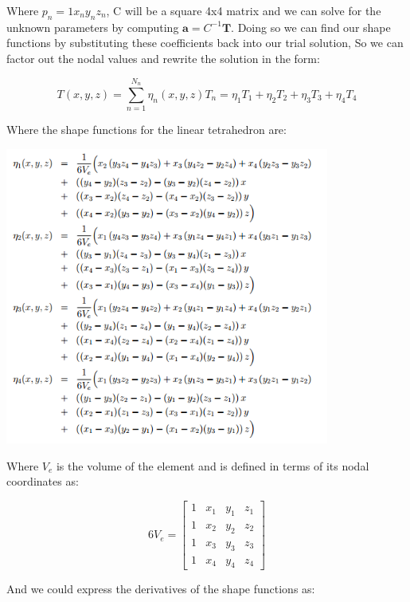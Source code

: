 \documentclass[12pt]{article}
\begin{document}
Where $p_n={1 x_n y_n z_n}$, C will be a square 4x4 matrix and we can solve for the unknown parameters by computing $\mathbf{a}=C^{-1}\mathbf{T}$. Doing so we can find our shape functions by substituting these coefficients back into our trial solution, So we can factor out the nodal values and rewrite the solution in the form:

\begin{equation}
T(x,y,z) = \sum_{n=1}^{N_n} \eta_n{(x,y,z)} T_n = \eta_1 T_1 + \eta_2 T_2 + \eta_3 T_3 + \eta_4 T_4
\end{equation}

Where the shape functions for the linear tetrahedron are:

\begin{center}
  \includegraphics[width=0.8\textwidth]{ShapeFunctions}
\end{center}

Where $V_e$ is the volume of the element and is defined in terms of its nodal coordinates as:

\begin{equation}
6V_e=\begin{bmatrix} 1 & x_1 & y_1 & z_1  \\ 1 & x_2 & y_2 & z_2  \\ 1 & x_3 & y_3 & z_3 \\ 1 & x_4 & y_4 & z_4 \end{bmatrix}
\end{equation}

And we could express the derivatives of the shape functions as:
\end{document}
